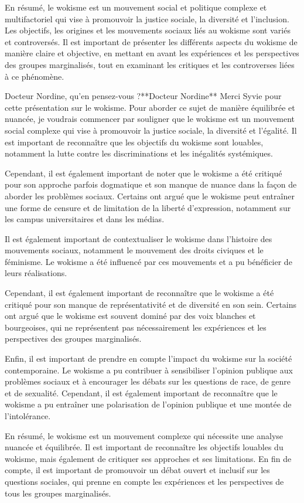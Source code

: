 En résumé, le wokisme est un mouvement social et politique complexe et multifactoriel qui vise à promouvoir la justice sociale, la diversité et l'inclusion. Les objectifs, les origines et les mouvements sociaux liés au wokisme sont variés et controversés. Il est important de présenter les différents aspects du wokisme de manière claire et objective, en mettant en avant les expériences et les perspectives des groupes marginalisés, tout en examinant les critiques et les controverses liées à ce phénomène.

Docteur Nordine, qu'en pensez-vous ?**Docteur Nordine**
Merci Syvie pour cette présentation sur le wokisme. Pour aborder ce sujet de manière équilibrée et nuancée, je voudrais commencer par souligner que le wokisme est un mouvement social complexe qui vise à promouvoir la justice sociale, la diversité et l'égalité. Il est important de reconnaître que les objectifs du wokisme sont louables, notamment la lutte contre les discriminations et les inégalités systémiques.

Cependant, il est également important de noter que le wokisme a été critiqué pour son approche parfois dogmatique et son manque de nuance dans la façon de aborder les problèmes sociaux. Certains ont argué que le wokisme peut entraîner une forme de censure et de limitation de la liberté d'expression, notamment sur les campus universitaires et dans les médias.

Il est également important de contextualiser le wokisme dans l'histoire des mouvements sociaux, notamment le mouvement des droits civiques et le féminisme. Le wokisme a été influencé par ces mouvements et a pu bénéficier de leurs réalisations.

Cependant, il est également important de reconnaître que le wokisme a été critiqué pour son manque de représentativité et de diversité en son sein. Certains ont argué que le wokisme est souvent dominé par des voix blanches et bourgeoises, qui ne représentent pas nécessairement les expériences et les perspectives des groupes marginalisés.

Enfin, il est important de prendre en compte l'impact du wokisme sur la société contemporaine. Le wokisme a pu contribuer à sensibiliser l'opinion publique aux problèmes sociaux et à encourager les débats sur les questions de race, de genre et de sexualité. Cependant, il est également important de reconnaître que le wokisme a pu entraîner une polarisation de l'opinion publique et une montée de l'intolérance.

En résumé, le wokisme est un mouvement complexe qui nécessite une analyse nuancée et équilibrée. Il est important de reconnaître les objectifs louables du wokisme, mais également de critiquer ses approches et ses limitations. En fin de compte, il est important de promouvoir un débat ouvert et inclusif sur les questions sociales, qui prenne en compte les expériences et les perspectives de tous les groupes marginalisés.

